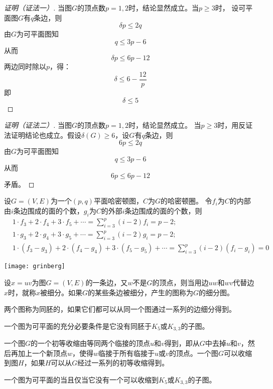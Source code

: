   \begin{proof}[证明（证法一）]
  当图$G$的顶点数$p=1,2$时，结论显然成立。当$p\geq 3$时，
  设可平面图$G$有$q$条边，则
  \[\delta p \leq 2q\]
  由$G$为可平面图知
  \[q \leq 3p - 6\]
  从而
  \[\delta p \leq 6p - 12\]
  两边同时除以$p$，得：
  \[\delta \leq 6 - \frac{12}{p}\]
  即
  \[\delta \leq 5\]
\end{proof}
\begin{proof}[证明（证法二）]
  当图$G$的顶点数$p=1,2$时，结论显然成立。
  当$p \geq 3$时，用反证法证明结论也成立。假设$\delta (G) \geq 6$，设$G$有$q$条边，则
  \[6p \leq 2q\]
  由$G$为可平面图知
  \[q \leq 3p - 6\]
  从而
  \[6p \leq 6p - 12\]
矛盾。  
\end{proof}

  \begin{Thm}
    设$G=(V,E)$为一个$(p,q)$平面哈密顿图，$C$为$G$的哈密顿圈。
    令$f_i$为$C$的内部由$i$条边围成的面的个数，$g_i$为$C$的外部$i$条边围成的面的个数，则
    \begin{align}
      &1 \cdot f_3 + 2 \cdot f_4 + 3 \cdot f_5 + \cdots = \sum_{i=3}^p(i-2)f_i = p - 2;\\
      &1 \cdot g_3 + 2 \cdot g_4 + 3 \cdot g_5 + \cdots = \sum_{i=3}^p(i-2)g_i = p - 2;\\
      &1 \cdot (f_3 - g_3) + 2 \cdot (f_4 - g_4) + 3 \cdot (f_5 - g_5) + \cdots = \sum_{i=3}^p(i-2)(f_i - g_i) = 0
    \end{align}
  \end{Thm}
    \centering
  \texttt{[image: grinberg]}
  \begin{Def}
    设$x=uv$为图$G=(V,E)$的一条边，又$w$不是$G$的顶点，则当用边$uw$和$wv$代替边$x$时，就称$x$被细分。如果$G$的某些条边被细分，产生的图称为$G$的细分图。
  \end{Def}
  \begin{Def}
    两个图称为同胚的，如果它们都可以从同一个图通过一系列的边细分得到。
  \end{Def}
  \begin{Thm}
    一个图为可平面的充分必要条件是它没有同胚于$K_5$或$K_{3,3}$的子图。
  \end{Thm}
  \begin{Def}
    一个图$G$的一个初等收缩由等同两个临接的顶点$u$和$v$得到，即从$G$中去掉$u$和$v$，然后再加上一个新顶点$w$，使得$w$临接于所有临接于$u$或$v$的顶点。一个图$G$可以收缩到图$H$，如果$H$可以从$G$经过一系列的初等收缩得到。
  \end{Def}
  \begin{Thm}
    一个图为可平面的当且仅当它没有一个可以收缩到$K_5$或$K_{3,3}$的子图。
  \end{Thm}

